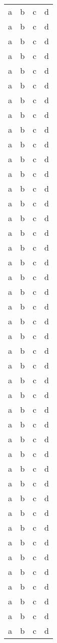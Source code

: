 \documentclass{article}
\begin{document}
\begin{longtable}{l
                      c
                      c
                      c}
    a & b & c & d \\
    a & b & c & d \\
    a & b & c & d \\
    a & b & c & d \\
    a & b & c & d \\
    a & b & c & d \\
    a & b & c & d \\
    a & b & c & d \\
    a & b & c & d \\
    a & b & c & d \\
    a & b & c & d \\
    a & b & c & d \\
    a & b & c & d \\
    a & b & c & d \\
    a & b & c & d \\
    a & b & c & d \\
    a & b & c & d \\
    a & b & c & d \\
    a & b & c & d \\
    a & b & c & d \\
    a & b & c & d \\
    a & b & c & d \\
    a & b & c & d \\
    a & b & c & d \\
    a & b & c & d \\
    a & b & c & d \\
    a & b & c & d \\
    a & b & c & d \\
    a & b & c & d \\
    a & b & c & d \\
    a & b & c & d \\
    a & b & c & d \\
    a & b & c & d \\
    a & b & c & d \\
    a & b & c & d \\
    a & b & c & d \\
    a & b & c & d \\
    a & b & c & d \\
    a & b & c & d \\
    a & b & c & d \\
    a & b & c & d \\
    a & b & c & d \\
    a & b & c & d \\

\end{longtable}
\end{document}
